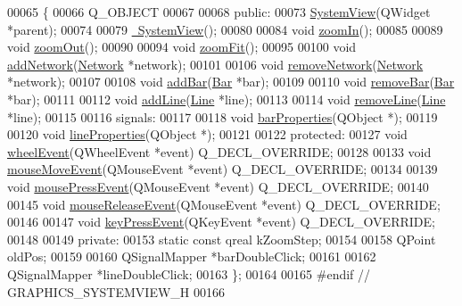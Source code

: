 \begin{DoxyCode}
00065 \{
00066   Q\_OBJECT
00067 
00068 \textcolor{keyword}{public}:
00073   \hyperlink{group___graphics_ga660a455ff7b98cb92410b0bf1cbb2eeb}{SystemView}(QWidget *parent);
00074 
00079   \hyperlink{group___graphics_ga0091352981c1efa5498819b69698db44}{~SystemView}();
00080 
00084   \textcolor{keywordtype}{void} \hyperlink{group___graphics_ga93170319ee5fbf9098353b383fc8a368}{zoomIn}();
00085 
00089   \textcolor{keywordtype}{void} \hyperlink{group___graphics_gaf971471c76265ec21cdde2aafe9b609f}{zoomOut}();
00090 
00094   \textcolor{keywordtype}{void} \hyperlink{group___graphics_gac1bf0b6a80216df74a8da1cb8ac5f0e8}{zoomFit}();
00095 
00100   \textcolor{keywordtype}{void} \hyperlink{group___graphics_gae183447d0777c7b2b940a977f9b64c3f}{addNetwork}(\hyperlink{class_network}{Network} *network);
00101 
00106   \textcolor{keywordtype}{void} \hyperlink{group___graphics_ga2078ad08ff93b9a8683d567e3f9f714e}{removeNetwork}(\hyperlink{class_network}{Network} *network);
00107 
00108   \textcolor{keywordtype}{void} \hyperlink{group___graphics_gac4e02019d41c203c788ff1e6f3ee460e}{addBar}(\hyperlink{class_bar}{Bar} *bar);
00109 
00110   \textcolor{keywordtype}{void} \hyperlink{group___graphics_ga1e96b08395a2f1b961dedbb3e8c99a50}{removeBar}(\hyperlink{class_bar}{Bar} *bar);
00111 
00112   \textcolor{keywordtype}{void} \hyperlink{group___graphics_gaed2fb15d518cab9a52ea1ee258846bfc}{addLine}(\hyperlink{class_line}{Line} *line);
00113 
00114   \textcolor{keywordtype}{void} \hyperlink{group___graphics_ga4af1d763d9b9c02933e62d1f6231ad18}{removeLine}(\hyperlink{class_line}{Line} *line);
00115 
00116 signals:
00117 
00118   \textcolor{keywordtype}{void} \hyperlink{class_system_view_a90bd4b070c8abaa5995899154421eb44}{barProperties}(QObject *);
00119 
00120   \textcolor{keywordtype}{void} \hyperlink{class_system_view_a58c4a0bf68178ab59066819118214360}{lineProperties}(QObject *);
00121 
00122 \textcolor{keyword}{protected}:
00127   \textcolor{keywordtype}{void} \hyperlink{group___graphics_gaab2fa6cebf9022eb6bf31497c0789675}{wheelEvent}(QWheelEvent *event) Q\_DECL\_OVERRIDE;
00128 
00133   \textcolor{keywordtype}{void} \hyperlink{group___graphics_gab19e233cd697852dd71140971cb6e122}{mouseMoveEvent}(QMouseEvent *event) Q\_DECL\_OVERRIDE;
00134 
00139   \textcolor{keywordtype}{void} \hyperlink{group___graphics_ga42d4a485d6d9bd891d9505a5213cf783}{mousePressEvent}(QMouseEvent *event) Q\_DECL\_OVERRIDE;
00140 
00145   \textcolor{keywordtype}{void} \hyperlink{group___graphics_gaa8a2664405194bbe29daa454aead7416}{mouseReleaseEvent}(QMouseEvent *event) Q\_DECL\_OVERRIDE;
00146 
00147   \textcolor{keywordtype}{void} \hyperlink{group___graphics_gac28465709119ef75862b33480ad23f56}{keyPressEvent}(QKeyEvent *event) Q\_DECL\_OVERRIDE;
00148   
00149 \textcolor{keyword}{private}:
00153   \textcolor{keyword}{static} \textcolor{keyword}{const} qreal kZoomStep;
00154 
00158   QPoint oldPos;
00159 
00160   QSignalMapper *barDoubleClick;
00161 
00162   QSignalMapper *lineDoubleClick;
00163 \};
00164 
00165 \textcolor{preprocessor}{#endif  // GRAPHICS\_SYSTEMVIEW\_H}
00166 
\end{DoxyCode}
